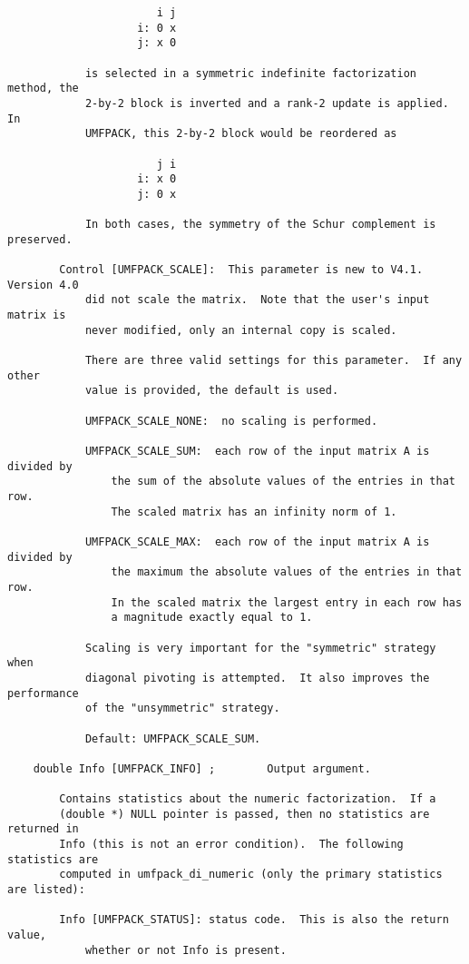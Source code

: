 \documentclass[11pt]{article}
\begin{document}
{\begin{verbatim}
                       i j
                    i: 0 x
                    j: x 0

            is selected in a symmetric indefinite factorization method, the
            2-by-2 block is inverted and a rank-2 update is applied.  In
            UMFPACK, this 2-by-2 block would be reordered as

                       j i
                    i: x 0
                    j: 0 x

            In both cases, the symmetry of the Schur complement is preserved.

        Control [UMFPACK_SCALE]:  This parameter is new to V4.1.  Version 4.0
            did not scale the matrix.  Note that the user's input matrix is
            never modified, only an internal copy is scaled.

            There are three valid settings for this parameter.  If any other
            value is provided, the default is used.

            UMFPACK_SCALE_NONE:  no scaling is performed.

            UMFPACK_SCALE_SUM:  each row of the input matrix A is divided by
                the sum of the absolute values of the entries in that row.
                The scaled matrix has an infinity norm of 1.

            UMFPACK_SCALE_MAX:  each row of the input matrix A is divided by
                the maximum the absolute values of the entries in that row.
                In the scaled matrix the largest entry in each row has
                a magnitude exactly equal to 1.

            Scaling is very important for the "symmetric" strategy when
            diagonal pivoting is attempted.  It also improves the performance
            of the "unsymmetric" strategy.

            Default: UMFPACK_SCALE_SUM.

    double Info [UMFPACK_INFO] ;        Output argument.

        Contains statistics about the numeric factorization.  If a
        (double *) NULL pointer is passed, then no statistics are returned in
        Info (this is not an error condition).  The following statistics are
        computed in umfpack_di_numeric (only the primary statistics are listed):

        Info [UMFPACK_STATUS]: status code.  This is also the return value,
            whether or not Info is present.


\end{verbatim}}
\end{document}
